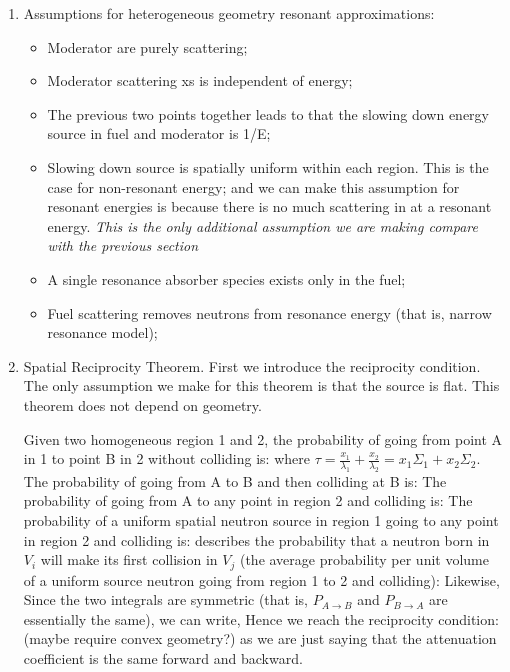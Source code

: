 \documentclass{school-22.211-notes}
\begin{document}
\begin{enumerate}
\item Assumptions for heterogeneous geometry resonant approximations:
\begin{itemize}
\item Moderator are purely scattering;
\item Moderator scattering xs is independent of energy;
\item The previous two points together leads to that the slowing down energy source in fuel and moderator is 1/E;
\item Slowing down source is spatially uniform within each region. This is the case for non-resonant energy; and we can make this assumption for resonant energies is because there is no much scattering in at a resonant energy. \textit{This is the only additional assumption we are making compare with the previous section}
\item A single resonance absorber species exists only in the fuel;
\item Fuel scattering removes neutrons from resonance energy (that is, narrow resonance model); 
\end{itemize}

\item Spatial Reciprocity Theorem. First we introduce the reciprocity condition. The only assumption we make for this theorem is that the source is flat. This theorem does not depend on geometry. 

Given two homogeneous region 1 and 2, the probability of going from point A in 1 to point B in 2 without colliding is:
where $\tau = \frac{x_1}{\lambda_1} + \frac{x_2}{\lambda_2} = x_1 \Sigma_1 + x_2 \Sigma_2$. The probability of going from A to B and then colliding at B is: 
The probability of going from A to any point in region 2 and colliding is:
The probability of a uniform spatial neutron source in region 1 going to any point in region 2 and colliding is:
 describes the probability that a neutron born in $V_i$ will make its first collision in $V_j$ (the average probability per unit volume of a uniform source neutron going from region 1 to 2 and colliding):
Likewise,
Since the two integrals are symmetric (that is, $P_{A\to B}$ and $P_{B \to A}$ are essentially the same), we can write,
Hence we reach the reciprocity condition:
 (maybe require convex geometry?) as we are just saying that the attenuation coefficient is the same forward and backward. 



\end{enumerate}
\end{document}
